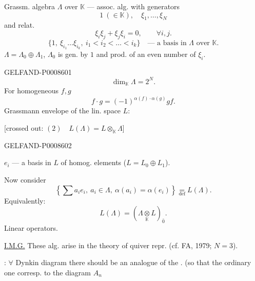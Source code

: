 Grassm. algebra \(\Lambda\) over \(\mathbb K\) — assoc. alg. with generators
\[
1\ (\in\mathbb K),\quad \xi_1,\ldots,\xi_N
\]
and relat.
\[
\xi_i\xi_j+\xi_j\xi_i=0,\qquad \forall i,j.
\]
\[
\{1,\ \xi_{i_1}\ldots\xi_{i_k},\ i_1<i_2<\ldots<i_k\}
\quad\text{— a basis in }\Lambda\text{ over }\mathbb K.
\]
\(\Lambda=\Lambda_0\oplus\Lambda_1\), \quad
\(\Lambda_0\) is gen. by \(1\) and prod. of an even number of \(\xi_i\).


\begin{GelfandAdjacentEvidence}{GELFAND-P000860}{1}
\[
\dim_{\mathbb K}\Lambda=2^N.
\]
For homogeneous \(f,g\)
\[
f\cdot g=(-1)^{\alpha(f)\cdot\alpha(g)}gf.\tag{1}
\]
Grassmann envelope of the lin. space \(L\):

[crossed out: \sout{\((2)\quad L(\Lambda)=L\otimes_{\mathbb K}\Lambda\)}]
\end{GelfandAdjacentEvidence}
\begin{GelfandAdjacentEvidence}{GELFAND-P000860}{2}


\(e_i\) — a basis in \(L\) of homog. elements
(\(L=L_0\oplus L_1\)).

Now consider
\[
\left\{\sum a_i e_i,\ a_i\in\Lambda,\ \alpha(a_i)=\alpha(e_i)\right\}
\underset{\mathrm{def}}{=}L(\Lambda).\tag{2}
\]
 Equivalently:
\[
L(\Lambda)=\left(\Lambda\underset{\mathbb K}{\otimes}L\right)_{\bar 0}.
\tag*{\((2)'\)}
\]
Linear operators.

\uline{I.M.G.} These alg. arise in the theory of quiver repr. (cf. FA, 1979; \(N=3\)).

: \(\forall\) Dynkin diagram there should be an analogue of the .
(so that the ordinary one corresp. to the diagram \(A_n\)

\end{GelfandAdjacentEvidence}
